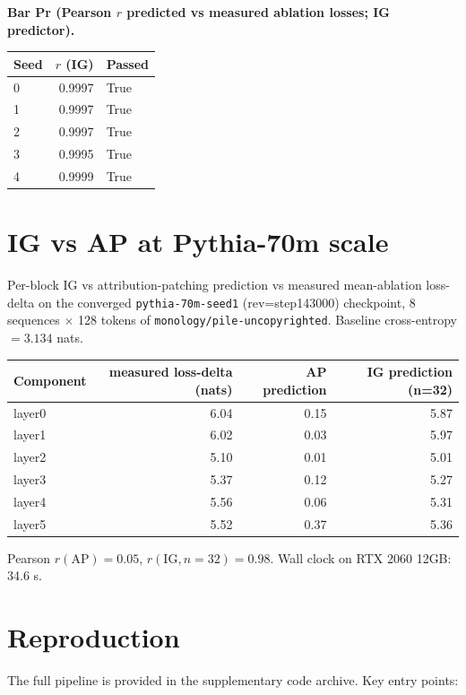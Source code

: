 \documentclass[11pt,letterpaper]{article}
\begin{document}
\textbf{Bar Pr (Pearson $r$ predicted vs measured ablation losses; IG predictor).}

\begin{center}
\begin{tabular}{lrl}
\toprule
Seed & $r$ (IG) & Passed \\
\midrule
0 & 0.9997 & True \\
1 & 0.9997 & True \\
2 & 0.9997 & True \\
3 & 0.9995 & True \\
4 & 0.9999 & True \\
\bottomrule
\end{tabular}
\end{center}

\section{IG vs AP at Pythia-70m scale}
\label{app:igap}

Per-block IG vs attribution-patching prediction vs measured mean-ablation loss-delta on the converged \texttt{pythia-70m-seed1} (rev=step143000) checkpoint, 8 sequences $\times$ 128 tokens of \texttt{monology/pile-uncopyrighted}. Baseline cross-entropy $= 3.134$ nats.

\begin{center}
\begin{tabular}{lrrr}
\toprule
Component & measured loss-delta (nats) & AP prediction & IG prediction (n=32) \\
\midrule
layer0 & 6.04 & 0.15 & 5.87 \\
layer1 & 6.02 & 0.03 & 5.97 \\
layer2 & 5.10 & 0.01 & 5.01 \\
layer3 & 5.37 & 0.12 & 5.27 \\
layer4 & 5.56 & 0.06 & 5.31 \\
layer5 & 5.52 & 0.37 & 5.36 \\
\bottomrule
\end{tabular}
\end{center}

Pearson $r(\mathrm{AP}) = 0.05$, $r(\mathrm{IG}, n{=}32) = 0.98$. Wall clock on RTX 2060 12GB: 34.6 s.

\section{Reproduction}
\label{app:reproduction}

The full pipeline is provided in the supplementary code archive. Key entry points:
\end{document}
